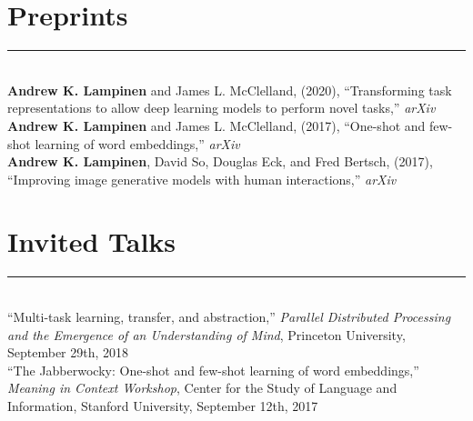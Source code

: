 \documentclass[margin]{res}
\begin{document}
\begin{resume}
\vspace{1pt}\section{Preprints} \vspace{-15pt} \rule{\textwidth}{0.5pt} \\[3pt]
\textbf{Andrew K. Lampinen} and James L. McClelland, (2020), {``Transforming task representations to allow deep learning models to perform novel tasks,''} \textit{arXiv} \\[3pt] 
\textbf{Andrew K. Lampinen} and James L. McClelland, (2017), {``One-shot and few-shot learning of word embeddings,''} \textit{arXiv} \\[3pt] 
\textbf{Andrew K. Lampinen}, David So, Douglas Eck, and Fred Bertsch, (2017), {``Improving image generative models with human interactions,''} \textit{arXiv} 

\vspace{1pt}\section{Invited Talks} \vspace{-15pt} \rule{\textwidth}{0.5pt} \\[3pt]
{``Multi-task learning, transfer, and abstraction,''} \textit{Parallel Distributed Processing and the Emergence of an Understanding of Mind}, Princeton University, September 29th, 2018\\[3pt] 
{``The Jabberwocky: One-shot and few-shot learning of word embeddings,''} \textit{Meaning in Context Workshop}, Center for the Study of Language and Information,  Stanford University, September 12th, 2017 
 

\end{resume}
\end{document}
